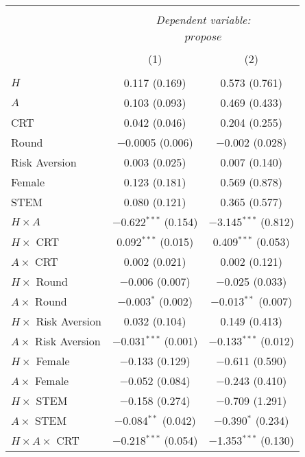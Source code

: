 
\begin{tabular}{@{\extracolsep{5pt}}lcc} 
\\[-1.8ex]\hline 
\hline \\[-1.8ex] 
 & \multicolumn{2}{c}{\textit{Dependent variable:}} \\ 
\cline{2-3} 
\\[-1.8ex] & \multicolumn{2}{c}{$propose$} \\ 
\\[-1.8ex] & (1) & (2)\\ 
\hline \\[-1.8ex] 
 $H$ & 0.117 (0.169) & 0.573 (0.761) \\ 
  $A$ & 0.103 (0.093) & 0.469 (0.433) \\ 
  CRT & 0.042 (0.046) & 0.204 (0.255) \\ 
  Round & $-$0.0005 (0.006) & $-$0.002 (0.028) \\ 
  Risk Aversion & 0.003 (0.025) & 0.007 (0.140) \\ 
  Female & 0.123 (0.181) & 0.569 (0.878) \\ 
  STEM & 0.080 (0.121) & 0.365 (0.577) \\ 
  $H\times A$ & $-$0.622$^{***}$ (0.154) & $-$3.145$^{***}$ (0.812) \\ 
  $H\times$ CRT & 0.092$^{***}$ (0.015) & 0.409$^{***}$ (0.053) \\ 
  $A\times$ CRT & 0.002 (0.021) & 0.002 (0.121) \\ 
  $H\times$ Round & $-$0.006 (0.007) & $-$0.025 (0.033) \\ 
  $A\times$ Round & $-$0.003$^{*}$ (0.002) & $-$0.013$^{**}$ (0.007) \\ 
  $H\times$ Risk Aversion & 0.032 (0.104) & 0.149 (0.413) \\ 
  $A\times$ Risk Aversion & $-$0.031$^{***}$ (0.001) & $-$0.133$^{***}$ (0.012) \\ 
  $H\times$ Female & $-$0.133 (0.129) & $-$0.611 (0.590) \\ 
  $A\times$ Female & $-$0.052 (0.084) & $-$0.243 (0.410) \\ 
  $H\times$ STEM & $-$0.158 (0.274) & $-$0.709 (1.291) \\ 
  $A\times$ STEM & $-$0.084$^{**}$ (0.042) & $-$0.390$^{*}$ (0.234) \\ 
  $H\times A\times$ CRT & $-$0.218$^{***}$ (0.054) & $-$1.353$^{***}$ (0.130) \\ 

\end{tabular}
